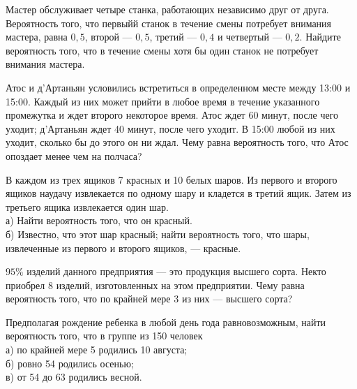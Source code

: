 \newpage\setcounter{zad}{0}



\begin{zkrW}{20}\noindent 
	Мастер обслуживает четыре станка, работающих независимо друг от друга. Вероятность того, что первыйй станок в течение смены потребует внимания мастера, равна $0{,}5$, второй --- $0{,}5$, третий --- $0{,}4$ и четвертый --- $0{,}2$. Найдите вероятность того, что в течение смены хотя бы один станок не потребует внимания мастера.
 
\end{zkrW}

\begin{zkrW}{20}\noindent 
	Атос и д'Артаньян условились встретиться в определенном месте между 13:00 и 15:00. Каждый из них может прийти в любое время в течение указанного промежутка и ждет второго некоторое время. Атос ждет 60 минут, после чего уходит; д'Артаньян ждет 40 минут, после чего уходит. В 15:00 любой из них уходит, сколько бы до этого он ни ждал. Чему равна вероятность того, что Атос опоздает менее чем на полчаса?
 
\end{zkrW}

\begin{zkrW}{20}\noindent 
	В каждом из трех ящиков 7 красных и 10 белых шаров. Из первого и второго ящиков наудачу извлекается по одному шару и кладется в третий ящик. Затем из третьего ящика извлекается один шар. \\ \indent а) Найти вероятность того, что он красный. \\ \indent б) Известно, что этот шар красный; найти вероятность того, что шары, извлеченные из первого и второго ящиков, --- красные.
 
\end{zkrW}

\begin{zkrW}{20}\noindent 
	$95\%$ изделий данного предприятия — это продукция высшего сорта. Некто приобрел 8 изделий, изготовленных на этом предприятии. Чему равна вероятность того, что по крайней мере 3 из них — высшего сорта?
 
\end{zkrW}

\begin{zkrW}{20}\noindent 
	Предполагая рождение ребенка в любой день года равновозможным, найти вероятность того, что в группе из 150 человек \\ \indent а) по крайней мере 5 родились 10 августа; \\ \indent б) ровно 54 родились осенью; \\ \indent в) от 54 до 63 родились весной.
 
\end{zkrW}


